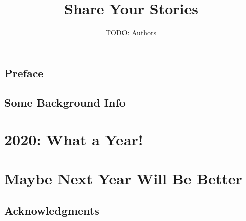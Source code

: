 \documentclass[12pt,letterpaper,footinclude=true,headinclude=true]{book} %
\title{Share Your Stories}
\author{TODO: Authors}
\begin{document}
	\maketitle
	
	\tableofcontents 
	
	
	
	
	
	\chapter*{Preface}
	
	
	\chapter{Some Background Info}
	
	
	\part{2020: What a Year!}
	
	
    \part{Maybe Next Year Will Be Better}
	
	
	\chapter*{Acknowledgments}
	
	
	
	{
		
		
		
	}
\end{document}
